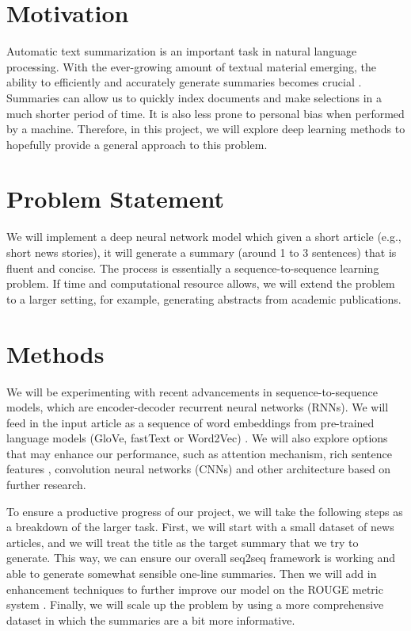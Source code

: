 \section{Motivation}
Automatic text summarization is an important task in natural language processing. With the ever-growing amount of textual material emerging, the ability to efficiently and accurately generate summaries becomes crucial \cite{gambhir2017recent}. Summaries can allow us to quickly index documents and make selections in a much shorter period of time. It is also less prone to personal bias when performed by a machine. Therefore, in this project, we will explore deep learning methods to hopefully provide a general approach to this problem.

\section{Problem Statement}
We will implement a deep neural network model which given a short article (e.g., short news stories), it will generate a summary (around 1 to 3 sentences) that is fluent and concise. The process is essentially a sequence-to-sequence learning problem. If time and computational resource allows, we will extend the problem to a larger setting, for example, generating abstracts from academic publications. 


\section{Methods}
We will be experimenting with recent advancements in sequence-to-sequence models, which are encoder-decoder recurrent neural networks (RNNs). We will feed in the input article as a sequence of word embeddings from pre-trained language models (GloVe, fastText or Word2Vec) . We will also explore options that may enhance our performance, such as attention mechanism, rich sentence features \cite{nallapati2016abstractive}, convolution neural networks (CNNs) and other architecture based on further research.  

To ensure a productive progress of our project, we will take the following steps as a breakdown of the larger task. First, we will start with a small dataset of news articles, and we will treat the title as the target summary that we try to generate. This way, we can ensure our overall seq2seq framework is working and able to generate somewhat sensible one-line summaries. Then we will add in enhancement techniques to further improve our model on the ROUGE metric system \cite{lin2004rouge}. Finally, we will scale up the problem by using a more comprehensive dataset in which the summaries are a bit more informative. 

